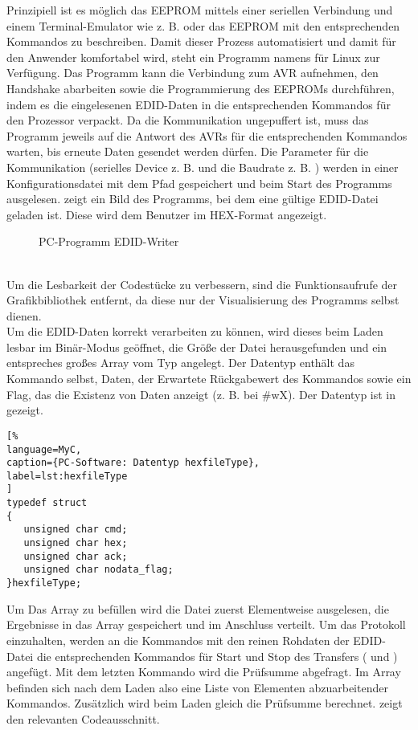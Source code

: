 Prinzipiell ist es möglich das EEPROM mittels einer seriellen Verbindung und einem Terminal-Emulator wie z. B.  oder  das EEPROM mit den entsprechenden Kommandos zu beschreiben. Damit dieser Prozess automatisiert und damit für den Anwender komfortabel wird, steht ein Programm namens  für Linux zur Verfügung. Das Programm kann die Verbindung zum AVR aufnehmen, den Handshake abarbeiten sowie die Programmierung des EEPROMs durchführen, indem es die eingelesenen EDID-Daten in die entsprechenden Kommandos für den Prozessor verpackt. Da die Kommunikation ungepuffert ist, muss das Programm jeweils auf die Antwort des AVRs für die entsprechenden Kommandos warten, bis erneute Daten gesendet werden dürfen. Die Parameter für die Kommunikation (serielles Device z. B.  und die Baudrate z. B. ) werden in einer Konfigurationsdatei mit dem Pfad  gespeichert und beim Start des Programms ausgelesen.  zeigt ein Bild des Programms, bei dem eine gültige EDID-Datei geladen ist. Diese wird dem Benutzer im HEX-Format angezeigt. 
\begin{figure}[htp]
	\center
    \caption{PC-Programm EDID-Writer}
    \label{fig:edid_writer1} 
\end{figure}\\
Um die Lesbarkeit der Codestücke zu verbessern, sind die Funktionsaufrufe der Grafikbibliothek  entfernt, da diese nur der Visualisierung des Programms selbst dienen.\\
Um die EDID-Daten korrekt verarbeiten zu können, wird dieses beim Laden lesbar im Binär-Modus geöffnet, die Größe der Datei herausgefunden und ein entspreches großes Array  vom Typ  angelegt. Der Datentyp enthält das Kommando selbst, Daten, der Erwartete Rückgabewert des Kommandos sowie ein Flag, das die Existenz von Daten anzeigt (z. B. bei \#wX\*). Der Datentyp  ist in  gezeigt.
\begin{lstlisting}[%
language=MyC,
caption={PC-Software: Datentyp hexfileType},
label=lst:hexfileType
]
typedef struct
{
   unsigned char cmd;
   unsigned char hex;
   unsigned char ack;
   unsigned char nodata_flag;
}hexfileType;
\end{lstlisting}%
Um Das Array  zu befüllen wird die Datei zuerst Elementweise ausgelesen, die Ergebnisse in das Array  gespeichert und im Anschluss verteilt. Um das Protokoll einzuhalten, werden an die Kommandos mit den reinen Rohdaten der EDID-Datei die entsprechenden Kommandos für Start und Stop des Transfers ( und ) angefügt. Mit dem letzten Kommando wird die Prüfsumme abgefragt. Im Array  befinden sich nach dem Laden also eine Liste von Elementen abzuarbeitender Kommandos. Zusätzlich wird beim Laden gleich die Prüfsumme berechnet.  zeigt den relevanten Codeausschnitt. 
